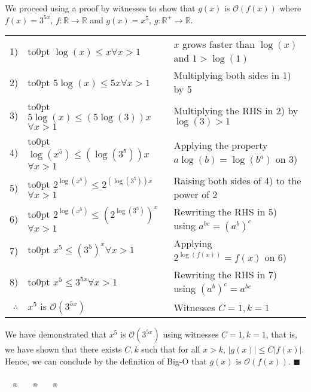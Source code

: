 \documentclass[answers]{exam}
\newcommand{\bigo}[1]{\mathcal{O}(#1)}
\renewcommand{\qed}{
   $\blacksquare$\\
}
\newenvironment{colored}[1][]{
    \bgroup\color{#1}
}{
\egroup\vspace{-0.8em}
}
\newenvironment{tableproof}[1][10pt]{
    \setlength{\tabcolsep}{#1}
    \begin{tabular}[t]{rl|l}
}{
\end{tabular}\vspace{1em}
}
\renewenvironment{solution}[1][]{\begin{answer}[#1]\begin{colored}[mySolColor]}{\end{colored}\end{answer}\vspace{1em}}
\newcommand{\hlinespace}{\\[0.3em]\hline \rule{0pt}{\normalbaselineskip}}
\newcommand{\decorend}{\vspace{1em}\noindent \textcolor{myDColor}{\hrulefill ~$\;\,_\circledast$~ \hrulefill ~$\;\,_\circledast$~ \hrulefill ~$\;\,_\circledast$~ \hrulefill}\cfoot{}}
\newcommand{\defspace}[1]{\gdef\tmpbox{#1}}
\newcommand{\talign}[2]{\hbox to0pt {#1}\hphantom{\tmpbox}#2}
\begin{document}
\begin{solution}[by witnesses]
    \noindent We proceed using a proof by witnesses to show that $g(x)$ is $\bigo{f(x)}$ where $f(x) = 3^{5x}$, $f: \mathbb{R} \rightarrow \mathbb{R}$ and $g(x) = x^5$, $g: \mathbb{R^+} \rightarrow \mathbb{R}$.\\

    \begin{tableproof}
    \defspace{$5\log(x) \le (5\log(3))x$}
        1) & \talign{$\log(x) \le x$}{\quad $\forall x > 1$} & $x$ grows faster than $\log(x)$ and $1 > \log(1)$\\
        2) & \talign{$5\log(x) \le 5x$}{\quad $\forall x > 1$} & Multiplying both sides in 1) by 5\\
        3) & \talign{$5\log(x) \le (5\log(3))x$}{\quad $\forall x > 1$} & Multiplying the RHS in 2) by $\log(3) > 1$\\
        4) & \talign{$\log(x^5) \le (\log(3^5))x$}{\quad $\forall x > 1$} & Applying the property $a\log(b) = \log(b^a)$ on 3)\\
        5) & \talign{$2^{\log(x^5)} \le 2^{(\log(3^5))x}$}{\quad $\forall x > 1$} & Raising both sides of 4) to the power of 2\\
        6) & \talign{$2^{\log(x^5)} \le \left(2^{\log\left(3^5\right)}\right)^x$}{\quad $\forall x > 1$} & Rewriting the RHS in 5) using $a^{bc} = \left(a^{b}\right)^c$\\
        7) & \talign{$x^5 \le \left(3^5\right)^x$}{\quad $\forall x > 1$} & Applying $2^{\log(f(x))} = f(x)$ on 6)\\
        8) & \talign{$x^5 \le 3^{5x}$}{\quad $\forall x > 1$} & Rewriting the RHS in 7) using $\left(a^{b}\right)^c = a^{bc}$\hlinespace
        $\therefore$ & $x^5$ is $\bigo{3^{5x}}$ & Witnesses $C = 1, k = 1$
    \end{tableproof}

    \noindent We have demonstrated that $x^5$ is $\bigo{3^{5x}}$ using witnesses $C = 1, k = 1$, that is, we have shown that there exists $C, k$ such that for all $x > k$, $|g(x)| \le C|f(x)|$. Hence, we can conclude by the definition of Big-O that $g(x)$ is $\bigo{f(x)}$.\qed
\end{solution}

\decorend
\end{document}
